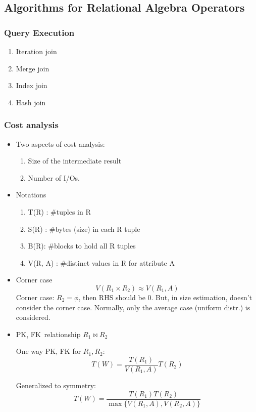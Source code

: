 \documentclass{article}
\begin{document}
\subsection{Algorithms for Relational Algebra Operators}
\subsubsection{Query Execution}
\begin{enumerate}
\item Iteration join
\item Merge join 
\item Index join 
\item Hash join 
\end{enumerate}
\subsubsection{Cost analysis}
\begin{itemize}
\item Two aspects of cost analysis:
\begin{enumerate}
\item Size of the intermediate result 
\item Number of I/Os.
\end{enumerate}
\item Notations
\begin{enumerate}
\item T(R) : #tuples in R
\item S(R) : #bytes (size) in each R tuple
\item B(R): #blocks to hold all R tuples 
\item V(R, A) : #distinct values in R for attribute A
\end{enumerate}
\item Corner case 
$$
V(R_1\times R_2) \approx V(R_1, A)
$$
Corner case: $R_2=\phi$, then RHS should be 0. But, in size estimation, doesn't consider the corner case. Normally, only the average case (uniform distr.) is considered. 
\end{itemize}
\begin{itemize}
\item \textbraceleft PK, FK\textbraceright\ relationship $R_1\bowtie R_2$

One way PK, FK for $R_1, R_2$: 
$$
T(W) = \frac{T(R_1)}{V(R_1, A)} T(R_2)
$$

Generalized to symmetry: 
$$
T(W) = \frac{T(R_1)T(R_2)}{\max\{V(R_1, A), V(R_2, A)\}}
$$
\end{itemize}
\end{document}
